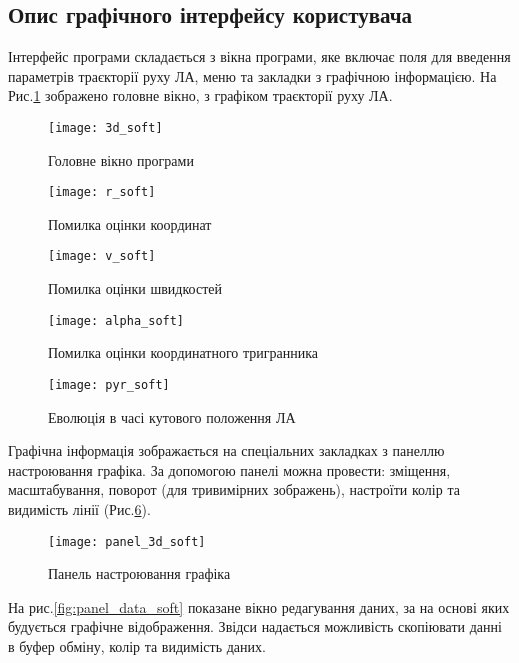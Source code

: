 \subsection{Опис графічного інтерфейсу користувача}

Інтерфейс програми складається з вікна програми, яке включає поля для введення параметрів траєкторії руху ЛА, меню та закладки з графічною інформацією. На Рис.\ref{fig:3d_soft} зображено головне вікно, з графіком траєкторії руху ЛА.

\begin{figure}[t]
\centering
\texttt{[image: 3d\_soft]}
\caption{Головне вікно програми}\label{fig:3d_soft}
\end{figure}

\begin{figure}[t]
\centering
\texttt{[image: r\_soft]}
\caption{Помилка оцінки координат}\label{fig:r_soft}
\end{figure}

\begin{figure}[t]
\centering
\texttt{[image: v\_soft]}
\caption{Помилка оцінки швидкостей}\label{fig:v_soft}
\end{figure}

\begin{figure}[t]
\centering
\texttt{[image: alpha\_soft]}
\caption{Помилка оцінки координатного тригранника}\label{fig:alpha_soft}
\end{figure}


\begin{figure}[t]
\centering
\texttt{[image: pyr\_soft]}
\caption{Еволюція в часі кутового положення ЛА}\label{fig:pyr_soft}
\end{figure}


Графічна інформація зображається на спеціальних закладках з панеллю настроювання графіка. За допомогою панелі можна провести: зміщення, масштабування, поворот (для тривимірних зображень), настроїти колір та видимість лінії (Рис.\ref{fig:panel_3d_soft}).

\begin{figure}[t]
\centering
\texttt{[image: panel\_3d\_soft]}
\caption{Панель настроювання графіка}\label{fig:panel_3d_soft}
\end{figure}

На рис.\ref{fig:panel_data_soft} показане вікно редагування даних, за на основі яких будується графічне відображення. Звідси надається можливість скопіювати данні в буфер обміну, колір та видимість даних.

